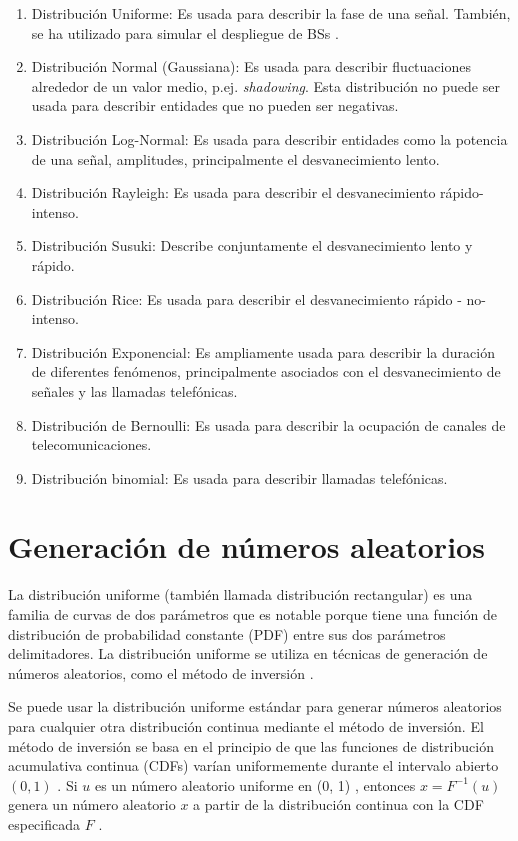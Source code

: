\begin{enumerate}
    \item Distribución Uniforme: Es usada para describir la fase de una señal. También, se ha utilizado para simular el despliegue de BSs \parencite{TurjmanSmallCells}.
    \item Distribución Normal (Gaussiana): Es usada para describir fluctuaciones alrededor de un valor medio, p.ej. \textit{shadowing}. Esta distribución no puede ser usada para describir entidades que no pueden ser negativas.
    \item Distribución Log-Normal: Es usada para describir entidades como la potencia de una señal, amplitudes, principalmente el desvanecimiento lento.
    \item Distribución Rayleigh: Es usada para describir el desvanecimiento rápido-intenso.
    \item Distribución Susuki: Describe conjuntamente el desvanecimiento lento y rápido.
    \item Distribución Rice: Es usada para describir el desvanecimiento rápido - no-intenso.
    \item Distribución Exponencial: Es ampliamente usada para describir la duración de diferentes fenómenos, principalmente asociados con el desvanecimiento de señales y las llamadas telefónicas.
    \item Distribución de Bernoulli: Es usada para describir la ocupación de canales de telecomunicaciones.
    \item Distribución binomial: Es usada para describir llamadas telefónicas.
\end{enumerate}

\section{Generación de números aleatorios}

La distribución uniforme (también llamada distribución rectangular) es una familia de curvas de dos parámetros que es notable porque tiene una función de distribución de probabilidad constante (PDF) entre sus dos parámetros delimitadores. La distribución uniforme se utiliza en técnicas de generación de números aleatorios, como el método de inversión \parencite{ UniformMatlab}.\newline

Se puede usar la distribución uniforme estándar para generar números aleatorios para cualquier otra distribución continua mediante el método de inversión. El método de inversión se basa en el principio de que las funciones de distribución acumulativa continua (CDFs) varían uniformemente durante el intervalo abierto $(0, 1)$ . Si $u$ es un número aleatorio uniforme en (0, 1) , entonces $x = F^{ -1} ( u )$ genera un número aleatorio $x$ a partir de la distribución continua con la CDF especificada $F$ \parencite{UniformMatlab}.\newline

